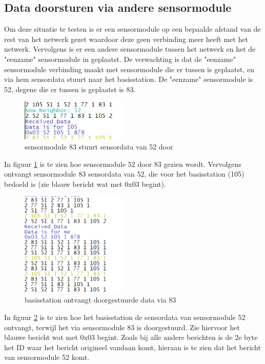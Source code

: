\documentclass[a4paper, 11pt]{article}
\begin{document}
\subsection{Data doorsturen via andere sensormodule}
Om deze situatie te testen is er een sensormodule op een bepaalde afstand van de rest van het netwerk gezet waardoor deze geen verbinding meer heeft met het netwerk. Vervolgens is er een andere sensormodule tussen het netwerk en het de "eenzame" sensormodule in geplaatst. De verwachting is dat de "eenzame" sensormodule verbinding maakt met sensormodule die er tussen is geplaatst, en via hem sensordata stuurt naar het basisstation. De "eenzame" sensormodule is 52, degene die er tussen is geplaatst is 83.
\newpage
\begin{figure}[h!]
	\centering
	\includegraphics[width=5cm]{TestResults/DataViaBuur/83_StuurtDataDoor.jpeg}
	\caption{sensormodule 83 stuurt sensordata van 52 door} \label{Doorsturen83}
\end{figure}
In figuur \ref{Doorsturen83} is te zien hoe sensormodule 52 door 83 gezien wordt. Vervolgens ontvangt sensormodule 83 sensordata van 52, die voor het basisstation (105) bedoeld is (zie blauw bericht wat met 0x03 begint).
\begin{figure}[h!]
	\centering
	\includegraphics[width=5cm]{TestResults/DataViaBuur/DataRecevied105.png}
	\caption{basisstation ontvangt doorgestuurde data via 83} \label{Doorsturen105}
\end{figure}
In figuur \ref{Doorsturen105} is te zien hoe het basisstation de sensordata van sensormodule 52 ontvangt, terwijl het via sensormodule 83 is doorgestuurd. Zie hiervoor het blauwe bericht wat met 0x03 begint. Zoals bij alle andere berichten is de 2e byte het ID waar het bericht origineel vandaan komt, hieraan is te zien dat het bericht van sensormodule 52 komt.
\newpage



\end{document}
